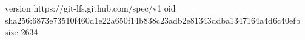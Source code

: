 version https://git-lfs.github.com/spec/v1
oid sha256:6873e73510f460d1e22a650f14b838c23adb2e81343ddba1347164a4d6c40efb
size 2634
